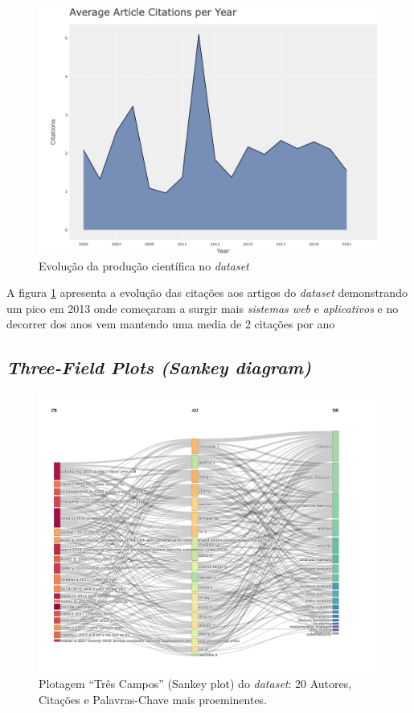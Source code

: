 \begin{figure}
    \centering
    \includegraphics[width=1\textwidth]{experiments/gsmartins96/AnaliseBibliometrica/Malware/Figs/citations_per_year.png}
    \caption{Evolução da produção científica no \textit{dataset}}
    \label{fig:evol:anual:citations:MALWARES@gsmartins96}
\end{figure}

A figura \ref{fig:evol:anual:citations:MALWARES@gsmartins96} apresenta a evolução das citações aos artigos do \textit{dataset} demonstrando um pico em 2013 onde começaram a surgir mais \textit{sistemas web} e \textit{aplicativos} e no decorrer dos anos vem mantendo uma media de 2 citações por ano

\subsection{\textit{Three-Field Plots (Sankey diagram)}}

\begin{figure}
    \centering
    \includegraphics[width=1\textwidth]{experiments/gsmartins96/AnaliseBibliometrica/Malware/Figs/three_fields_plots.png}
    \caption{Plotagem ``Três Campos'' (Sankey plot) do \textit{dataset}: 20 Autores, Citações e Palavras-Chave mais proeminentes.}
    \label{fig:MALWARES@gsmartins96:ThreeFieldPlot}
\end{figure}

